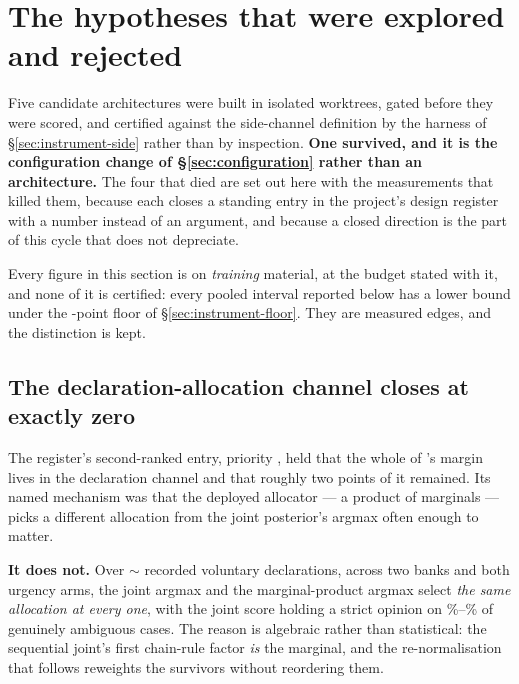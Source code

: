 \section{The hypotheses that were explored and rejected}
\label{sec:rejected}

Five candidate architectures were built in isolated worktrees, gated before they were scored, and
certified against the side-channel definition by the harness of \S\ref{sec:instrument-side} rather
than by inspection. \textbf{One survived, and it is the configuration change of
\S\ref{sec:configuration} rather than an architecture.} The four that died are set out here with the
measurements that killed them, because each closes a standing entry in the project's design register
with a number instead of an argument, and because a closed direction is the part of this cycle that
does not depreciate.

Every figure in this section is on \emph{training} material, at the budget stated with it, and none
of it is certified: every pooled interval reported below has a lower bound under the
\vsevenPrimaryFloor{}-point floor of \S\ref{sec:instrument-floor}. They are measured edges, and the
distinction is kept.

\subsection{The declaration-allocation channel closes at exactly zero}
\label{sec:rejected-alloc}

The register's second-ranked entry, priority \vsevenLonePriority{}, held that the whole of \vsix{}'s
margin lives in the declaration channel and that roughly two points of it remained. Its named
mechanism was that the deployed allocator --- a product of marginals --- picks a different allocation
from the joint posterior's argmax often enough to matter.

\textbf{It does not.} Over $\sim$\vsevenLoneDecls{} recorded voluntary declarations, across two banks
and both urgency arms, the joint argmax and the marginal-product argmax select \emph{the same
allocation at every one}, with the joint score holding a strict opinion on \vsevenLoneStrictLo\%--\vsevenLoneStrictHi\% of genuinely ambiguous cases. The reason is algebraic rather than statistical: the sequential joint's first
chain-rule factor \emph{is} the marginal, and the re-normalisation that follows reweights the
survivors without reordering them.

